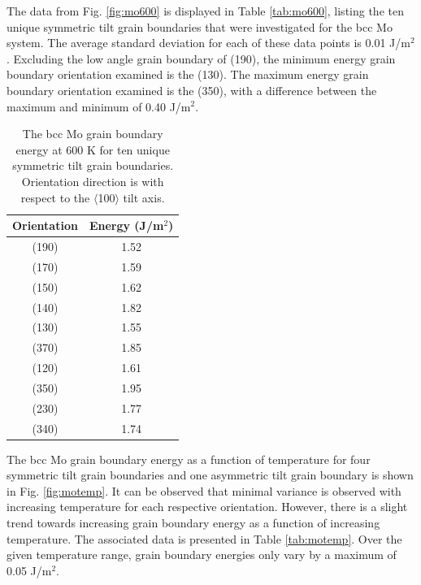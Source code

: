 \documentclass[review]{elsarticle}
\begin{document}
\FloatBarrier

The data from Fig. \ref{fig:mo600} is displayed in Table \ref{tab:mo600}, listing the ten unique symmetric tilt grain boundaries that were investigated for the bcc Mo system. The average standard deviation for each of these data points is 0.01 J/m$^{2}$. Excluding the low angle grain boundary of (190), the minimum energy grain boundary orientation examined is the (130). The maximum energy grain boundary orientation examined is the (350), with a difference between the maximum and minimum of 0.40 J/m$^{2}$.

\begin{table}[h]
\caption{The bcc Mo grain boundary energy at 600 K for ten unique symmetric tilt grain boundaries. Orientation direction is with respect to the $\langle$100$\rangle$ tilt axis.} \label{tab:mo600}
\begin{center}
\begin{tabular}{|c|c|}
	\hline
	Orientation & Energy (J/m$^{2}$) \\
	 \hline
	 (190) & 1.52 \\
	 (170) & 1.59 \\
	 (150) & 1.62 \\
	 (140) & 1.82 \\
	 (130) & 1.55 \\	 
	 (370) & 1.85 \\
	 (120) & 1.61 \\
	 (350) & 1.95 \\
	 (230) & 1.77 \\
	 (340) & 1.74 \\
	 \hline
\end{tabular}
\end{center}
\label{default}
\end{table}

\FloatBarrier

The bcc Mo grain boundary energy as a function of temperature for four symmetric tilt grain boundaries and one asymmetric tilt grain boundary is shown in Fig. \ref{fig:motemp}. It can be observed that minimal variance is observed with increasing temperature for each respective orientation. However, there is a slight trend towards increasing grain boundary energy as a function of increasing temperature. The associated data is presented in Table \ref{tab:motemp}. Over the given temperature range, grain boundary energies only vary by a maximum of 0.05 J/m$^{2}$.
\end{document}
